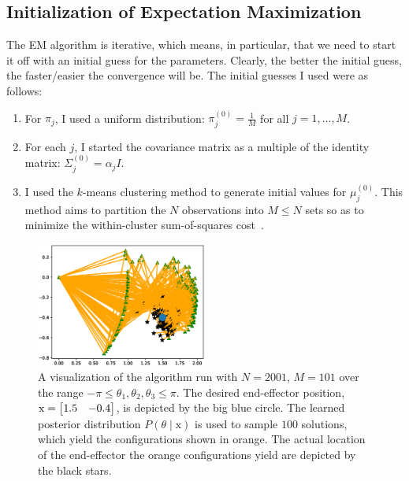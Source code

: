 \subsection{Initialization of Expectation Maximization}
\label{ssec:initialization}
%
The EM algorithm is iterative, which means, in particular, that we need to start
it off with an initial guess for the parameters. Clearly, the better the initial
guess, the faster/easier the convergence will be. The initial guesses I used
were as follows:
%
\begin{enumerate}
    \setlength\itemsep{0.0em}
    \item For $\pi_j$, I used a uniform distribution: $\pi_j^{(0)} =
    \frac{1}{M}$ for all $j = 1, \ldots, M$.
    \item For each $j$, I started the covariance matrix as a multiple of the
    identity matrix: $\Sigma_j^{(0)} = \alpha_j I$.
    \item I used the $k$-means clustering method to generate initial values for
    $\mu_j^{(0)}$. This method aims to partition the $N$ observations into $M
    \leq N$ sets so as to minimize the within-cluster sum-of-squares
    cost~\cite{wiki:K-means_clustering}.
\end{enumerate}
%
\begin{figure}
    \vspace{-20mm}
	\centering
	\includegraphics[width=0.5\textwidth]{./figures/GMM_sample_solution.eps}
	\caption{A visualization of the algorithm run with $N=2001$, $M=101$ over
    the range $-\pi \leq \theta_1, \theta_2, \theta_3 \leq \pi$. The desired end-effector position, $\mathrm{x} = \begin{bmatrix}1.5 &
    -0.4\end{bmatrix}$, is depicted by the big blue circle. The learned posterior
    distribution $P(\theta \mid \mathrm{x})$ is used to sample $100$ solutions,
    which yield the configurations shown in orange. The actual location of the
    end-effector the orange configurations yield are depicted by the black
    stars.}
    \label{fig:example_sol}
    \vspace{-30mm}
\end{figure}
%

